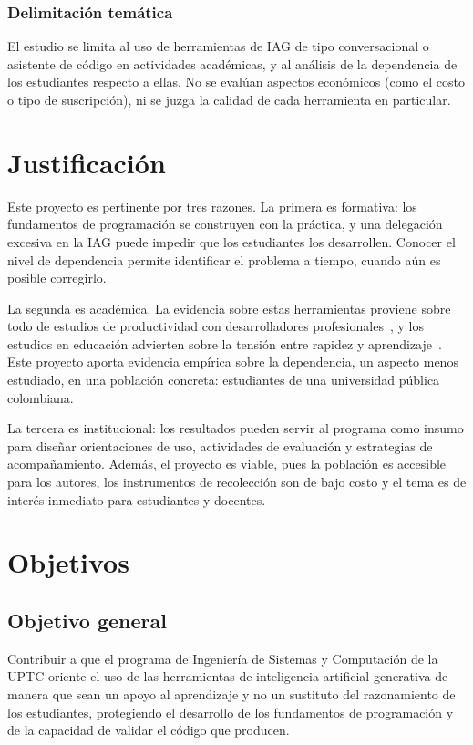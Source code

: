 \documentclass[12pt,letterpaper]{article}
\begin{document}
\subsubsection{Delimitación temática}
El estudio se limita al uso de herramientas de IAG de tipo conversacional o asistente de código en actividades académicas, y al análisis de la dependencia de los estudiantes respecto a ellas. No se evalúan aspectos económicos (como el costo o tipo de suscripción), ni se juzga la calidad de cada herramienta en particular.

\section{Justificación}

Este proyecto es pertinente por tres razones. La primera es formativa: los fundamentos de programación se construyen con la práctica, y una delegación excesiva en la IAG puede impedir que los estudiantes los desarrollen. Conocer el nivel de dependencia permite identificar el problema a tiempo, cuando aún es posible corregirlo.

La segunda es académica. La evidencia sobre estas herramientas proviene sobre todo de estudios de productividad con desarrolladores profesionales~\cite{peng2023impact}, y los estudios en educación advierten sobre la tensión entre rapidez y aprendizaje~\cite{martinovic2024ai,prather2023programming,ieee2024assisted}. Este proyecto aporta evidencia empírica sobre la dependencia, un aspecto menos estudiado, en una población concreta: estudiantes de una universidad pública colombiana.

La tercera es institucional: los resultados pueden servir al programa como insumo para diseñar orientaciones de uso, actividades de evaluación y estrategias de acompañamiento. Además, el proyecto es viable, pues la población es accesible para los autores, los instrumentos de recolección son de bajo costo y el tema es de interés inmediato para estudiantes y docentes.

\section{Objetivos}

\subsection{Objetivo general}

Contribuir a que el programa de Ingeniería de Sistemas y Computación de la UPTC oriente el uso de las herramientas de inteligencia artificial generativa de manera que sean un apoyo al aprendizaje y no un sustituto del razonamiento de los estudiantes, protegiendo el desarrollo de los fundamentos de programación y de la capacidad de validar el código que producen.
\end{document}
